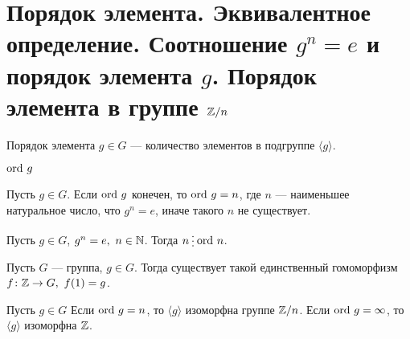 % 
% 
\section{Порядок элемента. Эквивалентное определение. Соотношение $ g^{n} = e$ и порядок элемента $ g$. Порядок элемента в группе  $ \mathbb{Z} / n$}
\begin{defn}
    {\sf Порядок элемента } $ g \in G$ --- количество элементов в подгруппе $ \langle g \rangle$.  
    \begin{name}
        ${\mathop{\text{\rm ord}}}~ g$
    \end{name}
\end{defn}
\begin{lm}
    Пусть $ g \in G$. Если $ {\mathop{\text{\rm ord}}}~ g$ конечен, то  $ {\mathop{\text{\rm ord}}}~ g =n$, где  $ n $ --- наименьшее натуральное число, что  $ g^{n} = e$, иначе такого $ n$ не существует.
\end{lm}
\begin{st}
    Пусть $ g \in G$, $ g^{n} = e, ~n \in \mathbb{N}$. Тогда $ n \del \ord n$. 
\end{st}

\begin{lm}
    Пусть $ G$ --- группа, $ g \in G$. Тогда существует такой единственный гомоморфизм  $ f\colon \mathbb{Z} \to  G, ~ f(1) = g$.
\end{lm}

\begin{thm}
    Пусть $ g \in G$ Если ${\mathop{\text{\rm ord}}}~ g = n$, то $ \langle g \rangle$ изоморфна группе  $ \mathbb{Z} / n$. Если  $ {\mathop{\text{\rm ord}}}~ g = \infty$, то $ \langle g \rangle $ изоморфна $ \mathbb{Z}$.
\end{thm}
% 
